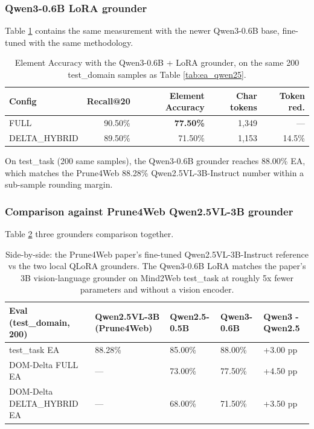 \subsubsection{Qwen3-0.6B LoRA grounder}

Table \ref{tab:ea_qwen3} contains the same measurement with the newer Qwen3-0.6B base, fine-tuned with the same methodology.

\begin{table}[!t]
\centering
\small
\begin{tabular}{l|r|r|r|r}
\hline
\textbf{Config} & \textbf{Recall@20} & \textbf{Element Accuracy} & \textbf{Char tokens} & \textbf{Token red.} \\
\hline
FULL & 90.50\% & \textbf{77.50\%} & 1{,}349 & --- \\
DELTA\_HYBRID & 89.50\% & 71.50\% & 1{,}153 & 14.5\% \\
\hline
\end{tabular}
\caption{Element Accuracy with the Qwen3-0.6B + LoRA grounder, on the same 200 test\_domain samples as Table \ref{tab:ea_qwen25}.}
\label{tab:ea_qwen3}
\end{table}

On test\_task (200 same samples), the Qwen3-0.6B grounder reaches 88.00\% EA, which matches the Prune4Web 88.28\% Qwen2.5VL-3B-Instruct number within a sub-sample rounding margin.

\subsubsection{Comparison against Prune4Web Qwen2.5VL-3B grounder}

Table \ref{tab:ea_sidebyside} three grounders comparison together.

\begin{table}[!t]
\small
\centering
\begin{tabularx}{\textwidth}{X|X|X|X|X}
\hline
\textbf{Eval (test\_domain, 200)} & \textbf{Qwen2.5VL-3B (Prune4Web)} & \textbf{Qwen2.5-0.5B} & \textbf{Qwen3-0.6B} & \textbf{Qwen3 - Qwen2.5} \\
\hline
test\_task EA & 88.28\% & 85.00\% & 88.00\% & +3.00 pp \\
DOM-Delta FULL EA & --- & 73.00\% & 77.50\% & +4.50 pp \\
DOM-Delta DELTA\_HYBRID EA & --- & 68.00\% & 71.50\% & +3.50 pp \\
\hline
\end{tabularx}
\caption{Side-by-side: the Prune4Web paper's fine-tuned Qwen2.5VL-3B-Instruct reference \cite{zhang2025prune4web} vs the two local QLoRA grounders. The Qwen3-0.6B LoRA matches the paper's 3B vision-language grounder on Mind2Web test\_task at roughly 5x fewer parameters and without a vision encoder.}
\label{tab:ea_sidebyside}
\end{table}


